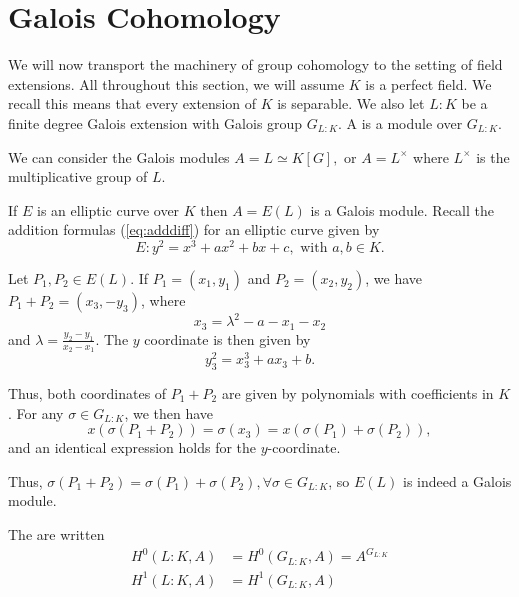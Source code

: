 \documentclass[12pt, a4paper]{report}
\begin{document}
\section{Galois Cohomology}

We will now transport the machinery of group cohomology to the setting of
field extensions.
All throughout this section, we will assume $K$ is a perfect field. We recall
this means that every extension of $K$ is separable. 
We also let $L : K$ be a finite degree Galois
extension with Galois group $G_{L:K}$.
A  is a module over $G_{L:K}$.

\begin{example}
  We can consider the Galois modules $A = L \simeq K[G], $ or $A =
  L^{\times}$ where $L^{\times}$ is the multiplicative group of $L$.
\end{example}

\begin{example}
  If $E$ is an elliptic curve over $K$ then $A = E(L)$ is a Galois module.
  Recall the addition formulas (\autoref{eq:adddiff}) for an elliptic curve given by 
  \[E: y^2 = x^3 + ax^2 + bx + c, \text{ with } a, b \in K.\]
  
  Let $P_1, P_2 \in E(L)$. 
  If $P_1 = (x_1, y_1)$ and $P_2 = (x_2,y_2)$, we have $P_1+P_2 = (x_3,-y_3)$,
  where
  \[x_3 = \lambda^2 - a - x_1 - x_2\]
  and $\lambda = \frac{y_2-y_1}{x_2-x_1}.$ The $y$ coordinate is then given by
  \[y_3^2 = x_3^3 + ax_3 + b.\]
  
  Thus, both coordinates of $P_1+P_2$ are given by polynomials with coefficients
  in $K$. 
  For any $\sigma \in G_{L:K}$, we then have
  \[x(\sigma(P_1+P_2)) = \sigma(x_3) = x(\sigma(P_1) + \sigma(P_2)),\]
  and an identical expression holds for the $y$-coordinate.
  
  Thus, $\sigma(P_1+P_2) = \sigma(P_1) + \sigma(P_2), \forall \sigma \in
  G_{L:K}$, so $E(L)$ is indeed a Galois module. 

\end{example}

\begin{defn}
  The  are written
  \begin{equation*}
    \begin{split}
      H^0(L:K, A) &= H^0(G_{L:K}, A) = A^{G_{L:K}} \\
      H^1(L:K, A) &= H^1(G_{L:K}, A)
     \end{split}
   \end{equation*}
\end{defn}
\end{document}

